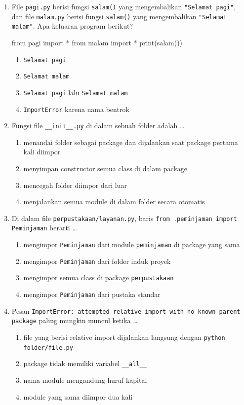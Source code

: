 \begin{enumerate}
  \item File \texttt{pagi.py} berisi fungsi \texttt{salam()} yang mengembalikan \texttt{"Selamat pagi"}, dan file \texttt{malam.py} berisi fungsi \texttt{salam()} yang mengembalikan \texttt{"Selamat malam"}. Apa keluaran program berikut?
\begin{kode}[Soal 4]
from pagi import *
from malam import *
print(salam())
\end{kode}
  \begin{enumerate}[label=\alph*.,itemsep=0pt]
    \item \texttt{Selamat pagi}
    \item \texttt{Selamat malam}
    \item \texttt{Selamat pagi} lalu \texttt{Selamat malam}
    \item \texttt{ImportError} karena nama bentrok
  \end{enumerate}

  \item Fungsi file \texttt{\_\_init\_\_.py} di dalam sebuah folder adalah \ldots
  \begin{enumerate}[label=\alph*.,itemsep=0pt]
    \item menandai folder sebagai package dan dijalankan saat package pertama kali diimpor
    \item menyimpan constructor semua class di dalam package
    \item mencegah folder diimpor dari luar
    \item menjalankan semua module di dalam folder secara otomatis
  \end{enumerate}

  \item Di dalam file \texttt{perpustakaan/layanan.py}, baris \texttt{from .peminjaman import Peminjaman} berarti \ldots
  \begin{enumerate}[label=\alph*.,itemsep=0pt]
    \item mengimpor \texttt{Peminjaman} dari module \texttt{peminjaman} di package yang sama
    \item mengimpor \texttt{Peminjaman} dari folder induk proyek
    \item mengimpor semua class di package \texttt{perpustakaan}
    \item mengimpor \texttt{Peminjaman} dari pustaka standar
  \end{enumerate}

  \item Pesan \texttt{ImportError: attempted relative import with no known parent package} paling mungkin muncul ketika \ldots
  \begin{enumerate}[label=\alph*.,itemsep=0pt]
    \item file yang berisi relative import dijalankan langsung dengan \texttt{python folder/file.py}
    \item package tidak memiliki variabel \texttt{\_\_all\_\_}
    \item nama module mengandung huruf kapital
    \item module yang sama diimpor dua kali
  \end{enumerate}


\end{enumerate}
